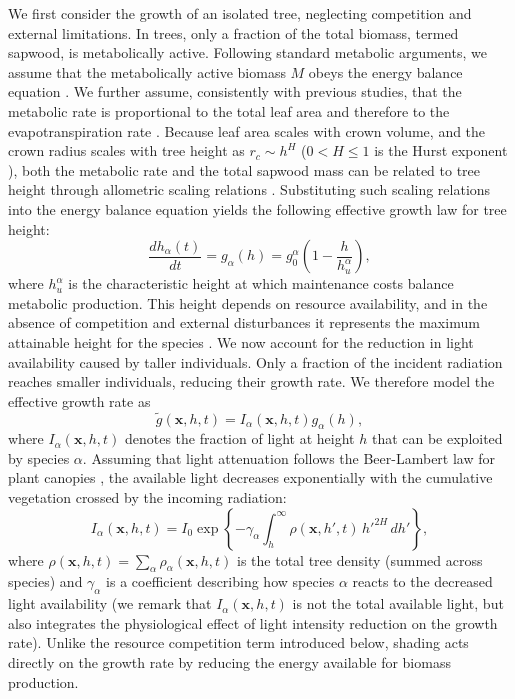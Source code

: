 \documentclass[aps,pre,twocolumn,superscriptaddress,10pt]{revtex4-2}
\begin{document}
We first consider the growth of an isolated tree, neglecting competition and external limitations. In trees, only a fraction of the total biomass, termed sapwood, is metabolically active.
Following standard metabolic arguments, we assume that the metabolically active biomass $M$ obeys the energy balance equation \cite{ west1997general, enquist1998allometric, enquist2002global, brown2004toward, west2001general, mori2010mixed} \MMnoref.
We further assume, consistently with previous studies, that the metabolic rate is proportional to the total leaf area and therefore to the evapotranspiration rate \cite{mori2010mixed, simini2010self, banavar2014form, volkov2022seeing}. 
Because leaf area scales with crown volume, and the crown radius scales with tree height as $r_c \sim h^H$ ($0 < H \leq 1$ is the Hurst exponent \cite{simini2010self, Comita2007}), both the metabolic rate and the total sapwood mass can be related to tree height through allometric scaling relations \MMnoref. Substituting such scaling relations into the energy balance equation yields the following effective growth law for tree height:
\begin{equation}
\frac{dh_{\alpha}(t)}{d t}=g_\alpha(h)=g_0^{\alpha}\left(1-\frac{h}{h_u^{\alpha}}\right),
\label{eq:single-tree-growth}
\end{equation}
where $h^\alpha_u$ is the characteristic height at which maintenance costs balance metabolic production. This height depends on resource availability, and in the absence of competition and external disturbances it represents the maximum attainable height for the species \MMnoref. 
We now account for the reduction in light availability caused by taller individuals. Only a fraction of the incident radiation reaches smaller individuals, reducing their growth rate.  We therefore model the effective growth rate as 
\begin{equation}
\tilde{g}(\mathbf{x},h,t)=I_{\alpha}(\mathbf{x},h,t) g_{\alpha}(h),
\end{equation}
where $I_{\alpha}(\mathbf{x},h,t)$ denotes the fraction of light at height $h$ that can be exploited by species $\alpha$. Assuming that light attenuation follows the Beer-Lambert law for plant canopies \cite{monsi1953lichtfaktor,MONSI2005}, the available light decreases exponentially with the cumulative vegetation crossed by the incoming radiation:
\begin{equation}
I_{\alpha}(\mathbf{x},h,t)=I_0\exp\left\{-\gamma_{\alpha}
\int_h^{\infty}\rho(\mathbf{x},h',t)\,h'^{2H}\,dh'
\right\},
\end{equation}
where $\rho(\mathbf{x},h,t) = \sum_\alpha \rho_\alpha(\mathbf{x},h,t)$ is the total tree density (summed across species) and $\gamma_{\alpha}$ is a coefficient describing how species $\alpha$ reacts to the decreased light availability (we remark that $I_{\alpha}(\mathbf{x},h,t)$ is not the total available light, but also integrates the physiological effect of light intensity reduction on the growth rate). Unlike the resource competition term introduced below, shading acts directly on the growth rate by reducing the energy available for biomass production.
\end{document}
